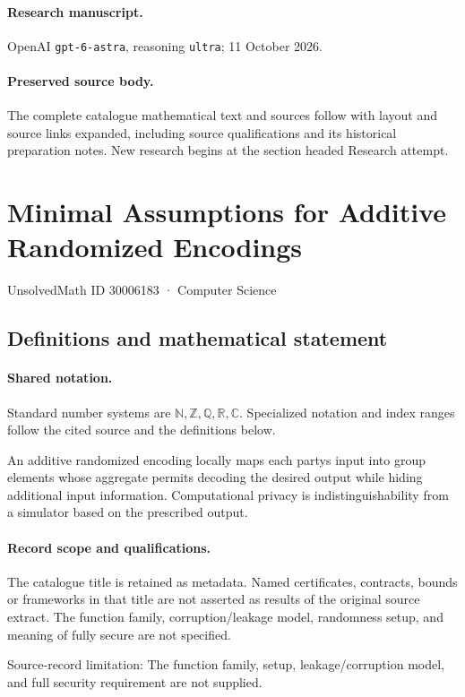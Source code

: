 \documentclass[11pt]{article}
\begin{document}
\paragraph{Research manuscript.} OpenAI \texttt{gpt-6-astra}, reasoning \texttt{ultra}; 11 October 2026.
\paragraph{Preserved source body.} The complete catalogue mathematical text and sources follow with layout and source links expanded, including source qualifications and its historical preparation notes. New research begins at the section headed Research attempt.

\section{Minimal Assumptions for Additive Randomized Encodings}\label{30006183}
{\small UnsolvedMath ID 30006183 · Computer Science}
\subsection{Definitions and mathematical statement}

\paragraph{Shared notation.}Standard number systems are $\mathbb N,\mathbb Z,\mathbb Q,\mathbb R,\mathbb C$. Specialized notation and index ranges follow the cited source and the definitions below.


An additive randomized encoding locally maps each party\textquotesingle s input into group elements whose aggregate permits decoding the desired output while hiding additional input information. Computational privacy is indistinguishability from a simulator based on the prescribed output.
\paragraph{Record scope and qualifications.}
The catalogue title is retained as metadata. Named certificates, contracts, bounds or frameworks in that title are not asserted as results of the original source extract.
The function family, corruption/leakage model, randomness setup, and meaning of fully secure are not specified.

Source-record limitation: The function family, setup, leakage/corruption model, and full security requirement are not supplied.
\end{document}
